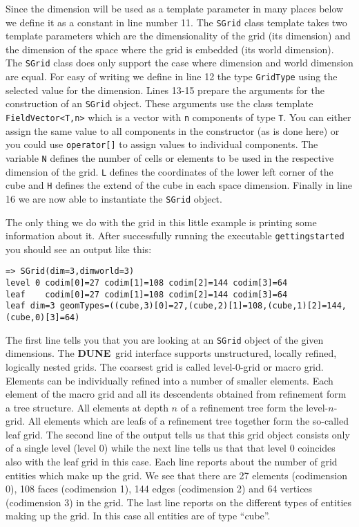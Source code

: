 \documentclass[11pt,a4paper,headinclude,footinclude,DIV14,BCOR8.25mm,titlepage,twoside,openright,normalheadings]{scrreprt}
\newcommand{\Dune}{{\sf\bfseries DUNE}}
\begin{document}
Since the dimension will be used as a template parameter in many
places below we define it as a constant in line number 11.
The \lstinline!SGrid! class template takes two template
parameters which are the dimensionality of the grid (its dimension)
and the dimension of the space where the grid is embedded (its world
dimension). The \lstinline!SGrid! class does only support the case
where dimension and world dimension are equal. For easy of writing we
define in line 12 the type \lstinline!GridType! using the selected value for the dimension.
Lines 13-15 prepare the arguments for the construction of an
\lstinline!SGrid! object. These arguments use the class template
\lstinline!FieldVector<T,n>! which is a vector with \lstinline!n!
components of type \lstinline!T!. You can either assign the same value
to all components in the constructor (as is done here) or you could
use \lstinline!operator[]! to assign values to individual components.
The variable \lstinline!N! defines the number of cells or elements to
be used in the respective dimension of the grid. \lstinline!L! defines
the coordinates of the lower left corner of the cube and \lstinline!H!
defines the extend of the cube in each space dimension. Finally in
line 16 we are now able to instantiate the \lstinline!SGrid!
object.

The only thing we do with the grid in this little example is printing
some information about it. After successfully running the executable
\lstinline!gettingstarted! you should see an output like this:

\begin{lstlisting}[basicstyle=\ttfamily\scriptsize]
=> SGrid(dim=3,dimworld=3)
level 0 codim[0]=27 codim[1]=108 codim[2]=144 codim[3]=64
leaf    codim[0]=27 codim[1]=108 codim[2]=144 codim[3]=64
leaf dim=3 geomTypes=((cube,3)[0]=27,(cube,2)[1]=108,(cube,1)[2]=144,(cube,0)[3]=64)
\end{lstlisting}

The first line tells you that you are looking at an \lstinline!SGrid!
object of the given dimensions. The \Dune\ grid interface supports
unstructured, locally refined, logically nested grids. The coarsest
grid is called level-0-grid or macro grid. Elements can be
individually refined into a number of smaller elements. Each element
of the macro grid and all its descendents obtained from refinement
form a tree structure. All elements at depth $n$ of a refinement tree
form the level-$n$-grid. All elements which are leafs of a refinement
tree together form the so-called leaf grid. The second line of the
output tells us that this grid object consists only of a single level
(level $0$) while the next line tells us that that level 0 coincides
also with the leaf grid in this case. Each line reports about the
number of grid entities which make up the grid. We see that there are
27 elements (codimension 0), 108 faces (codimension 1), 144 edges
(codimension 2) and 64 vertices (codimension 3) in the grid. The last
line reports on the different types of entities making up the grid. In
this case all entities are of type ``cube''.
\end{document}
